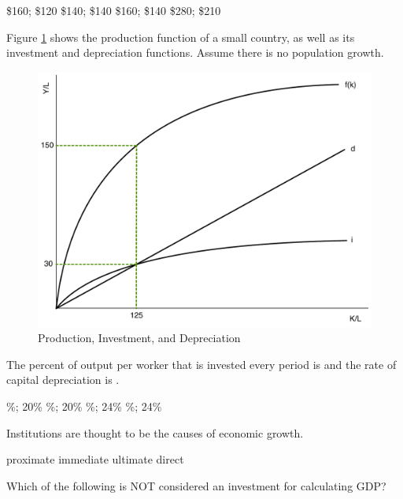 \documentclass[addpoints,11pt]{exam}
\theoremstyle{definition}
\newcommand{\blank}[0]{\underline{\hspace{3cm}}}
\begin{document}
\begin{questions}
	\begin{choices}
		\CorrectChoice \$160; \$120
		\choice \$140; \$140
		\choice \$160; \$140
		\choice \$280; \$210
	\end{choices}
	
	
	\question Figure \ref{MC22} shows the production function of a small country, as well as its investment and depreciation functions. Assume there is no population growth.
	
	
	\begin{figure}[H]
		\centering
		\includegraphics[scale=.35]{Final_MC22.pdf}
		\caption{Production, Investment, and Depreciation}
		\label{MC22}
	\end{figure}
	
	The percent of output per worker that is invested every period is \blank and the rate of capital depreciation is \blank.
	
	\begin{choices}
		\%; 20\%
		\%; 20\%
		\%; 24\%
		\%; 24\%
	\end{choices}
	
\newpage
	
	\question Institutions are thought to be the \blank causes of economic growth.
	
	\begin{choices}
		\choice proximate
		\choice immediate 
		\CorrectChoice ultimate
		\choice direct
	\end{choices}
	
	\question Which of the following is NOT considered an investment for calculating GDP?
	

\end{questions}
\end{document}
